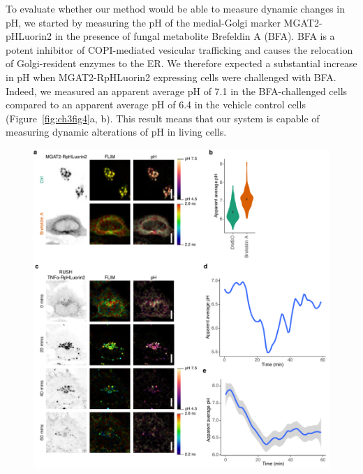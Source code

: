 To evaluate whether our method would be able to measure dynamic changes in pH, we started by measuring the pH of the medial-Golgi marker MGAT2-pHLuorin2 in the presence of fungal metabolite Brefeldin A (BFA). BFA is a potent inhibitor of COPI-mediated vesicular trafficking and causes the relocation of Golgi-resident enzymes to the ER\cite{galea_high-content_2015,klausner_brefeldin_1992}. We therefore expected a substantial increase in pH when MGAT2-RpHLuorin2 expressing cells were challenged with BFA. Indeed, we measured an apparent average pH of 7.1 in the BFA-challenged cells compared to an apparent average pH of 6.4 in the vehicle control cells (Figure~\ref{fig:ch3fig4}a, b). This result means that our system is capable of measuring dynamic alterations of pH in living cells.

\begin{figure}
    \includegraphics[keepaspectratio=true,width=\textwidth,height=\textheight]{chapters/chapter3/chapter3_Figure4.pdf}

\end{figure}
